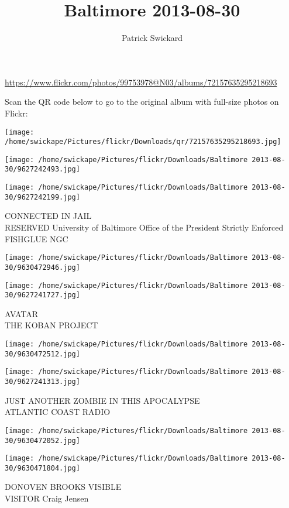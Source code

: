 \documentclass[10pt,letterpaper]{article}
\title{Baltimore 2013-08-30}
\author{Patrick Swickard}
\date{}
\begin{document}
\maketitle

\url{https://www.flickr.com/photos/99753978@N03/albums/72157635295218693}

Scan the QR code below to go to the original album with full-size photos on Flickr:

\texttt{[image: /home/swickape/Pictures/flickr/Downloads/qr/72157635295218693.jpg]}
\pagebreak

\texttt{[image: /home/swickape/Pictures/flickr/Downloads/Baltimore 2013-08-30/9627242493.jpg]}

\vspace{0.25in}
\texttt{[image: /home/swickape/Pictures/flickr/Downloads/Baltimore 2013-08-30/9627242199.jpg]}

CONNECTED IN JAIL\\
RESERVED University of Baltimore Office of the President Strictly Enforced FISHGLUE NGC
\pagebreak

\texttt{[image: /home/swickape/Pictures/flickr/Downloads/Baltimore 2013-08-30/9630472946.jpg]}

\vspace{0.25in}
\texttt{[image: /home/swickape/Pictures/flickr/Downloads/Baltimore 2013-08-30/9627241727.jpg]}

AVATAR\\
THE KOBAN PROJECT
\pagebreak

\texttt{[image: /home/swickape/Pictures/flickr/Downloads/Baltimore 2013-08-30/9630472512.jpg]}

\vspace{0.25in}
\texttt{[image: /home/swickape/Pictures/flickr/Downloads/Baltimore 2013-08-30/9627241313.jpg]}

JUST ANOTHER ZOMBIE IN THIS APOCALYPSE\\
ATLANTIC COAST RADIO
\pagebreak

\texttt{[image: /home/swickape/Pictures/flickr/Downloads/Baltimore 2013-08-30/9630472052.jpg]}

\vspace{0.25in}
\texttt{[image: /home/swickape/Pictures/flickr/Downloads/Baltimore 2013-08-30/9630471804.jpg]}

DONOVEN BROOKS VISIBLE\\
VISITOR Craig Jensen
\pagebreak
\end{document}
